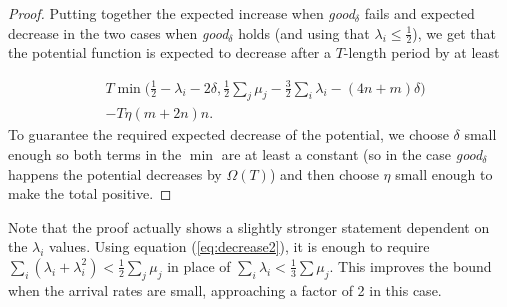 \begin{proof}
Putting together the expected increase when \emph{good}$_\delta$ fails and expected decrease in the two cases when \emph{good}$_\delta$ holds (and using that $\lambda_i \le \frac12$), we get that the potential function is expected to decrease after a $T$-length period by at least

\begin{eqnarray*}
&T\min\big(\frac12 -\lambda_i-2\delta,\frac12 \sum_j \mu_j -\frac{3}{2} \sum_i\lambda_i  -(4n+m)\delta\big)\\
& - T\eta (m+2n)n.
\end{eqnarray*}
To guarantee the required expected decrease of the potential, we choose $\delta$ small enough so both terms in the $\min$ are at least a constant (so in the case  \emph{good}$_\delta$ happens the potential decreases by $\Omega(T)$) and then choose $\eta$ small enough to make the total positive.
\end{proof}
\begin{remark}\label{remark:lambda-dependent-factor}
  Note that the proof actually shows a slightly stronger statement dependent on the $\lambda_i$ values. Using equation (\ref{eq:decrease2}), it is enough to require
  $\sum_i (\lambda_i +\lambda_i^2)< \frac12 \sum_j \mu_j$ in place of $\sum_i \lambda_i < \frac13\sum \mu_j$. This improves the bound when the arrival rates are small, approaching a factor of 2 in this case.   
\end{remark}
    



